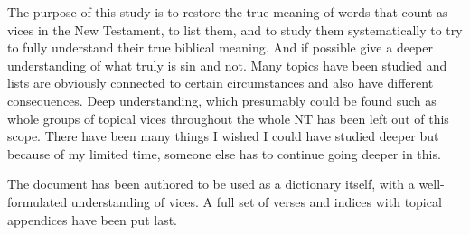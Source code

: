 The purpose of this study is to restore the true meaning of words that count as vices
in the New Testament, to list them, and to study them systematically to try to fully 
understand their true biblical meaning. And if possible give a deeper understanding of what
truly is sin and not. Many topics have been studied and lists are obviously connected to
certain circumstances and also have different consequences. Deep understanding, which
presumably could be found such as whole groups of topical vices throughout the
whole NT has been left out of this scope. There have been many things I wished I could 
have studied deeper but because of my limited time, someone else has to continue going 
deeper in this.

The document has been authored to be used as a dictionary itself, with a well-formulated understanding
of vices. A full set of verses and indices with topical appendices have been put last.
